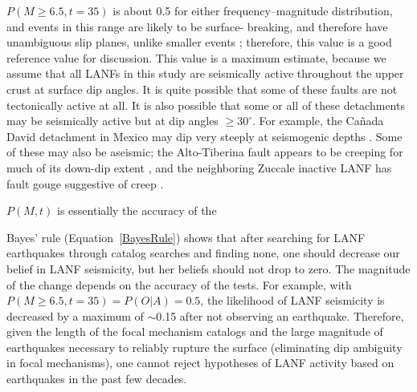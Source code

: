 \documentclass[twocolumn,grl]{AGUTeX}
\begin{document}
\begin{article}
$P(M\ge6.5, t=35)$ is about 0.5 for either frequency--magnitude distribution,
and events in this range are likely to be surface- breaking, and therefore have
unambiguous slip planes, unlike smaller events \citep{hecker2013eqdist}; 
therefore, this value is a good reference value for discussion.
This value is a maximum estimate, because we assume that all LANFs in this
study are seismically active throughout the upper crust at surface dip angles.
It is quite possible that some of these faults are not tectonically active
at all. It is also possible that some or all of these detachments may be
seismically active but at dip angles $\ge30^\circ$.  For example, the Ca\~nada
David detachment in Mexico may dip very steeply at seismogenic depths 
\citep{fletcherspelz2009}.
Some of these may also be aseismic; the Alto-Tiberina fault appears to
be creeping for much of its down-dip extent
\citep{hreinsdottir2009altotib}, and the neighboring Zuccale inactive
LANF has fault gouge suggestive of creep  \citep{collettiniholdsworth2004}.


$P(M,t)$ is essentially the accuracy of the 



Bayes' rule (Equation~\ref{BayesRule}) shows that after searching for LANF 
earthquakes through catalog searches and finding none, one should decrease
our belief in LANF seismicity, but her beliefs should not drop to zero.  The
magnitude of the change depends on the accuracy of the tests. For example,
with $P(M\ge6.5, t=35) = P(O|A) = 0.5$, the likelihood of LANF seismicity
is decreased by a maximum of $\sim$0.15 after not observing an earthquake.
Therefore, given the length of the focal mechanism catalogs and the large
magnitude of earthquakes necessary to reliably rupture the surface
(eliminating dip ambiguity in focal mechanisms), one cannot reject hypotheses
of LANF activity based on earthquakes in the past few decades.


\end{article}
\end{document}
